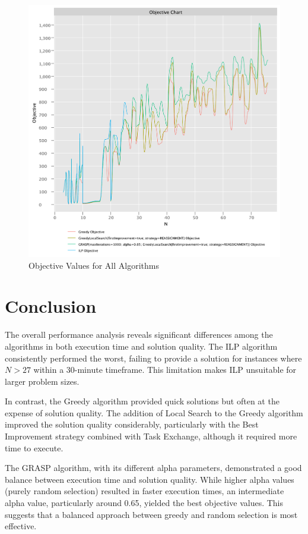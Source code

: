 \documentclass{article}
\begin{document}
\begin{figure}[!h]
    \centering
    \includegraphics[width=1\textwidth]{./documentation/assets/new.all.objectiveChart.pdf}
    \caption{Objective Values for All Algorithms}
    \label{fig:all_objective}
\end{figure}\FloatBarrier

\newpage

\section{Conclusion}

The overall performance analysis reveals significant differences among the algorithms in both execution time and solution quality. The ILP algorithm consistently performed the worst, failing to provide a solution for instances where \( N > 27 \) within a 30-minute timeframe. This limitation makes ILP unsuitable for larger problem sizes.

In contrast, the Greedy algorithm provided quick solutions but often at the expense of solution quality. The addition of Local Search to the Greedy algorithm improved the solution quality considerably, particularly with the Best Improvement strategy combined with Task Exchange, although it required more time to execute.

The GRASP algorithm, with its different alpha parameters, demonstrated a good balance between execution time and solution quality. While higher alpha values (purely random selection) resulted in faster execution times, an intermediate alpha value, particularly around 0.65, yielded the best objective values. This suggests that a balanced approach between greedy and random selection is most effective.
\end{document}
